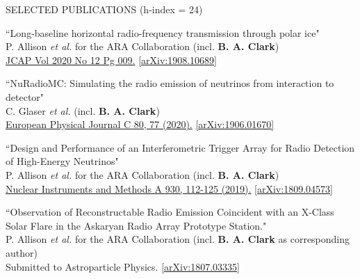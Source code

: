 \documentclass{resume} %
\begin{document}
\begin{rSection}{SELECTED PUBLICATIONS (h-index = 24)}
\begin{etaremune}
  \item ``Long-baseline horizontal radio-frequency transmission through polar ice" \\
 P. Allison {\it et al.} for the ARA Collaboration (incl. \textbf{B. A. Clark})\\    \href{https://iopscience.iop.org/article/10.1088/1475-7516/2020/12/009}{JCAP Vol 2020 No 12 Pg 009.} \href{https://arxiv.org/abs/1908.10689}{[arXiv:1908.10689]}

  \item ``NuRadioMC: Simulating the radio emission of neutrinos from interaction to detector" \\
 C. Glaser {\it et al.} (incl. \textbf{B. A. Clark})\\     \href{https://doi.org/10.1140/epjc/s10052-020-7612-8}{European Physical Journal C 80, 77 (2020).} \href{https://arxiv.org/abs/1906.01670}{[arXiv:1906.01670]}
 

  \item ``Design and Performance of an Interferometric Trigger Array for Radio Detection of High-Energy Neutrinos" \\
 P. Allison {\it et al.} for the ARA Collaboration (incl. \textbf{B. A. Clark}) \\    \href{https://doi.org/10.1016/j.nima.2019.01.067}{Nuclear Instruments and Methods A 930, 112-125 (2019).}  \href{https://arxiv.org/abs/1809.04573}{[arXiv:1809.04573]}
 

 \item ``Observation of Reconstructable Radio Emission Coincident with an X-Class Solar Flare in the Askaryan Radio Array Prototype Station." \\
P. Allison {\it et al.} for the ARA Collaboration (incl. \textbf{B. A. Clark} as corresponding author) \\
 Submitted to Astroparticle Physics. \href{https://arxiv.org/abs/1807.03335}{[arXiv:1807.03335]}
 


\end{etaremune}
\end{rSection}
\end{document}
